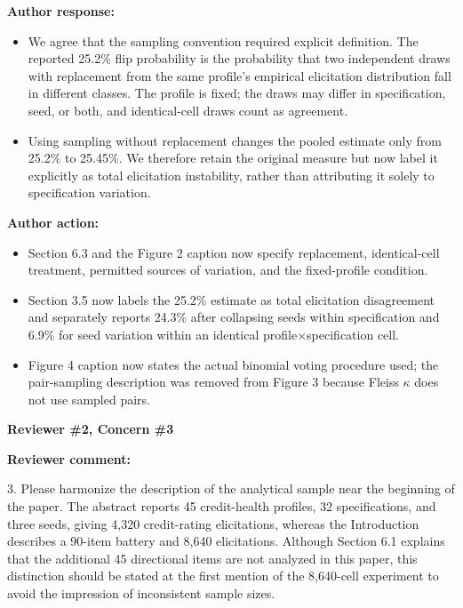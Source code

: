 \documentclass[11pt]{article}
\newcommand{\rvcomment}[1]{{\color{ReviewerGreen}#1}}
\newcommand{\concern}[1]{\textbf{\color{ReviewerGreen}#1}}
\begin{document}
\textbf{Author response:}

\begin{itemize}
\item We agree that the sampling convention required explicit definition. The reported 25.2\% flip
probability is the probability that two independent draws with replacement from the same
profile's empirical elicitation distribution fall in different classes. The profile is fixed; the
draws may differ in specification, seed, or both, and identical-cell draws count as agreement.
\item Using sampling without replacement changes the pooled estimate only from 25.2\% to 25.45\%. We
therefore retain the original measure but now label it explicitly as total elicitation
instability, rather than attributing it solely to specification variation.
\end{itemize}

\textbf{Author action:}

\begin{itemize}
\item Section 6.3 and the Figure 2 caption now specify replacement, identical-cell treatment,
permitted sources of variation, and the fixed-profile condition.
\item Section 3.5 now labels the 25.2\% estimate as total elicitation disagreement and
separately reports 24.3\% after collapsing seeds within specification and 6.9\% for seed variation
within an identical profile$\times$specification cell.
\item Figure 4 caption now states the actual binomial voting procedure used; the
pair-sampling description was removed from Figure 3 because Fleiss $\kappa$ does not use sampled
pairs.
\end{itemize}

\vspace{4pt}

\concern{Reviewer \#2, Concern \#3}

\concern{Reviewer comment:}

\rvcomment{3. Please harmonize the description of the analytical sample near the beginning of the
paper. The abstract reports 45 credit-health profiles, 32 specifications, and three seeds, giving
4,320 credit-rating elicitations, whereas the Introduction describes a 90-item battery and 8,640
elicitations. Although Section 6.1 explains that the additional 45 directional items are not
analyzed in this paper, this distinction should be stated at the first mention of the 8,640-cell
experiment to avoid the impression of inconsistent sample sizes.}
\end{document}

